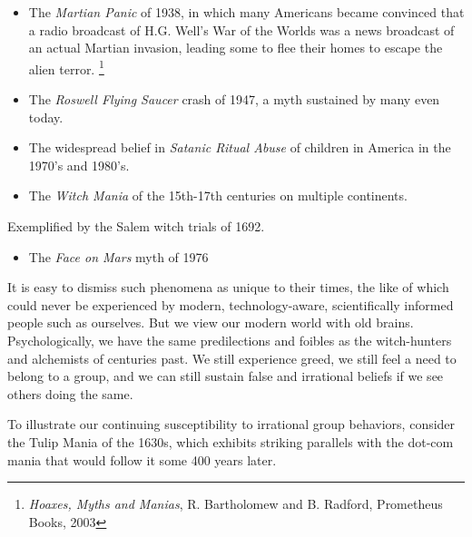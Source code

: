 \documentclass{article}
\begin{document}
\begin{itemize}
\item The \emph{Martian Panic} of 1938, in which many Americans became convinced
that a radio broadcast of H.G. Well's War of the Worlds was a news
broadcast of an actual Martian invasion, leading some to flee their
homes to escape the alien terror. \footnote{\emph{Hoaxes, Myths and Manias}, R. Bartholomew and B. Radford,
Prometheus Books, 2003}
\item The \emph{Roswell Flying Saucer} crash of 1947, a myth sustained by many
even today.\\
\item The widespread belief in \emph{Satanic Ritual Abuse} of children in
America in the 1970's and 1980's.\\
\item The \emph{Witch Mania} of the 15th-17th centuries on multiple continents.
\end{itemize}

Exemplified by the Salem witch trials of 1692.

\begin{itemize}
\item The \emph{Face on Mars} myth of 1976
\end{itemize}

It is easy to dismiss such phenomena as unique to their times, the like
of which could never be experienced by modern, technology-aware,
scientifically informed people such as ourselves. But we view our modern
world with old brains. Psychologically, we have the same predilections
and foibles as the witch-hunters and alchemists of centuries past. We
still experience greed, we still feel a need to belong to a group, and
we can still sustain false and irrational beliefs if we see others doing
the same.

To illustrate our continuing susceptibility to irrational group
behaviors, consider the Tulip Mania of the 1630s, which exhibits
striking parallels with the dot-com mania that would follow it some 400
years later.
\end{document}
